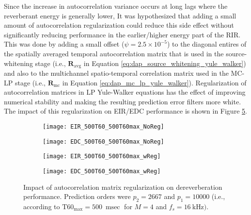 
Since the increase in autocorrelation variance occurs at long lags where the reverberant energy is generally lower, It was hypothesized that adding a small amount of autocorrelation regularization could reduce this side effect without significantly reducing performance in the earlier/higher energy part of the RIR. This was done by adding a small offset ($\psi = 2.5 \times 10^{-5}$) to the diagonal entires of the spatially averaged temporal autocorrelation matrix that is used in the source-whitening stage (i.e., $\boldsymbol{R}_{\mathrm{avg}}$ in Equation \ref{eq:dap_source_whitening_yule_walker}) and also to the multichannel spatio-temporal correlation matrix used in the MC-LP stage  (i.e., $\boldsymbol{R}_{\mathrm{mc}}$ in Equation \ref{eq:dap_mc_lp_yule_walker}). Regularization of autocorrelation matrices in LP Yule-Walker equations has the effect of improving numerical stability and making the resulting prediction error filters more white. The impact of this regularization on EIR/EDC performance is shown in Figure \ref{fig:params_regularization_500T60}.

\begin{figure}[H]
	\centering
	\begin{subfigure}[b]{0.42\textwidth}
		\centering
		\texttt{[image: EIR\_500T60\_500T60max\_NoReg]}
		\subcaption{}
		\label{subfig:EIR_500T60_500T60max_NoReg}
	\end{subfigure}
	\begin{subfigure}[b]{0.45\textwidth}
		\centering
		\texttt{[image: EDC\_500T60\_500T60max\_NoReg]}
		\subcaption{}
		\label{subfig:EDC_500T60_500T60max_NoReg}
	\end{subfigure}
	
	\begin{subfigure}[b]{0.42\textwidth}
		\centering
		\texttt{[image: EIR\_500T60\_500T60max\_wReg]}
		\subcaption{}
		\label{subfig:EIR_500T60_500T60max_wReg}
	\end{subfigure}
	\begin{subfigure}[b]{0.45\textwidth}
		\centering
		\texttt{[image: EDC\_500T60\_500T60max\_wReg]}
		\subcaption{}
		\label{subfig:EDC_500T60_500T60max_wReg}
	\end{subfigure}
	\caption[EDC Impact of autocorrelation regularization]{Impact of autocorrelation matrix regularization on dereverberation performance.  Prediction orders were $p_2 = 2667$ and $p_1=10000$ (i.e., according to $\mathrm{T60}_{\mathrm{max}} = \qty{500}{\milli\sec}$ for $M=4$ and $f_s=\qty{16}{\kilo\hertz})$.}
	\label{fig:params_regularization_500T60}
\end{figure}

